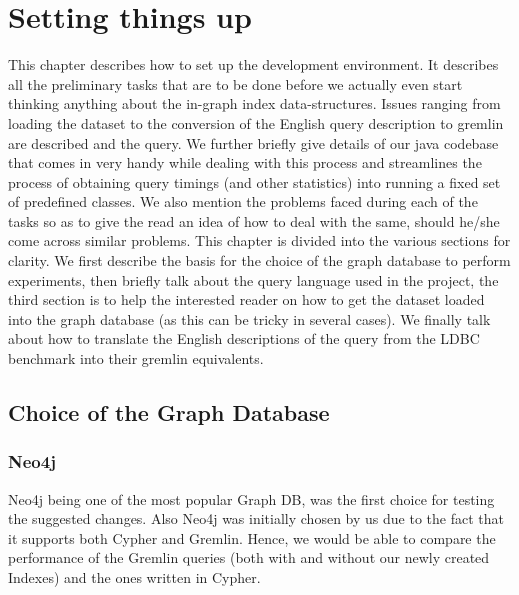 
\chapter{Setting things up} %

\label{Chapter2} %


This chapter describes how to set up the development environment. It describes all the preliminary tasks that are to be done before we actually even start thinking anything about the in-graph index data-structures. Issues ranging from loading the dataset to the conversion of the English query description to gremlin are described and the query. We further briefly give details of our java codebase that comes in very handy while dealing with this process and streamlines the process of obtaining query timings (and other statistics) into running a fixed set of predefined classes. We also mention the problems faced during each of the tasks so as to give the read an idea of how to deal with the same, should he/she come across similar problems. This chapter is divided into the various sections for clarity. We first describe the basis for the choice of the graph database to perform experiments, then briefly talk about the query language used in the project, the third section is to help the interested reader on how to get the dataset loaded into the graph database (as this can be tricky in several cases). We finally talk about how to translate the English descriptions of the query from the LDBC benchmark into their gremlin equivalents.

\section{Choice of the Graph Database}

\subsection{Neo4j}
Neo4j being one of the most popular Graph DB, was the first choice for testing the suggested changes. Also Neo4j was initially chosen by us due to the fact that it supports both Cypher and Gremlin. Hence, we would be able to compare the performance of the Gremlin queries (both with and without our newly created Indexes) and the ones written in Cypher.

